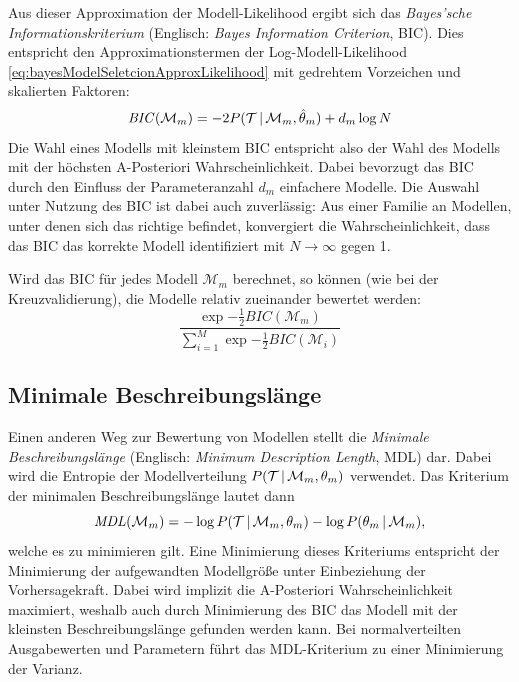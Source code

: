 			Aus dieser Approximation der Modell-Likelihood ergibt sich das \emph{Bayes'sche Informationskriterium} (Englisch: \emph{Bayes Information Criterion}, BIC). Dies entspricht den Approximationstermen der Log-Modell-Likelihood \eqref{eq:bayesModelSeletcionApproxLikelihood} mit gedrehtem Vorzeichen und skalierten Faktoren:
			\begin{equation}
				\mathit{BIC}(\mathcal{M}_m) = -2 P(\mathcal{T} \,\vert\, \mathcal{M}_m, \hat{\theta}_m) + d_m \log N
			\end{equation}
			Die Wahl eines Modells mit kleinstem BIC entspricht also der Wahl des Modells mit der höchsten A-Posteriori Wahrscheinlichkeit. Dabei bevorzugt das BIC durch den Einfluss der Parameteranzahl \(d_m\) einfachere Modelle. Die Auswahl unter Nutzung des BIC ist dabei auch zuverlässig: Aus einer Familie an Modellen, unter denen sich das richtige befindet, konvergiert die Wahrscheinlichkeit, dass das BIC das korrekte Modell identifiziert mit \( N \to \infty \) gegen \num{1}.

			Wird das BIC für jedes Modell \(\mathcal{M}_m\) berechnet, so können (wie bei der Kreuzvalidierung), die Modelle relativ zueinander bewertet werden:
			\begin{equation}
				\frac{\exp{-\frac{1}{2} \mathit{BIC}(\mathcal{M}_m)}}{\sum_{i = 1}^{M} \exp{-\frac{1}{2} \mathit{BIC}(\mathcal{M}_i)}}
			\end{equation}

		\subsection{Minimale Beschreibungslänge}  %
			Einen anderen Weg zur Bewertung von Modellen stellt die \emph{Minimale Beschreibungslänge} (Englisch: \emph{Minimum Description Length}, MDL) dar. Dabei wird die Entropie der Modellverteilung \( P(\mathcal{T} \,\vert\, \mathcal{M}_m, \theta_m) \) verwendet. Das Kriterium der minimalen Beschreibungslänge lautet dann
			\begin{equation}
				\mathit{MDL}(\mathcal{M}_m) = -\log P(\mathcal{T} \,\vert\, \mathcal{M}_m, \theta_m) - \log P(\theta_m \,\vert\, \mathcal{M}_m),
			\end{equation}
			welche es zu minimieren gilt. Eine Minimierung dieses Kriteriums entspricht der Minimierung der aufgewandten Modellgröße unter Einbeziehung der Vorhersagekraft. Dabei wird implizit die A-Posteriori Wahrscheinlichkeit maximiert, weshalb auch durch Minimierung des BIC das Modell mit der kleinsten Beschreibungslänge gefunden werden kann. Bei normalverteilten Ausgabewerten und Parametern führt das MDL-Kriterium zu einer Minimierung der Varianz.


